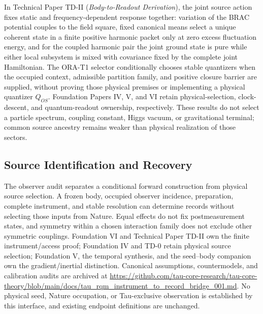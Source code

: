 \documentclass[11pt]{article}
\begin{document}
In Technical Paper TD-II (\emph{Body-to-Readout Derivation}), the joint source
action fixes static and frequency-dependent response together: variation of the
BRAC potential couples to the field square, fixed canonical means select a
unique coherent state in a finite positive harmonic packet only at zero excess
fluctuation energy, and for the coupled harmonic pair the joint ground state is
pure while either local subsystem is mixed with covariance fixed by the
complete joint Hamiltonian. The ORA-T1 selector conditionally chooses stable
quantizers when the occupied context, admissible partition family, and positive
closure barrier are supplied, without proving those physical premises or
implementing a physical quantizer $Q_{OS}$. Foundation Papers IV, V, and VI
retain physical-selection, clock-descent, and quantum-readout ownership,
respectively. These results do not select a particle spectrum, coupling
constant, Higgs vacuum, or gravitational terminal; common source ancestry
remains weaker than physical realization of those sectors.

\subsection{Source Identification and Recovery}
The observer audit separates a conditional forward construction from physical source selection. A frozen body, occupied observer incidence, preparation, complete instrument, and stable resolution can determine records without selecting those inputs from Nature. Equal effects do not fix postmeasurement states, and symmetry within a chosen interaction family does not exclude other symmetric couplings. Foundation VI and Technical Paper TD-II own the finite instrument/access proof; Foundation IV and TD-0 retain physical source selection; Foundation V, the temporal synthesis, and the seed--body companion own the gradient/inertial distinction. Canonical assumptions, countermodels, and calibration audits are archived at \url{https://github.com/tau-core-research/tau-core-theory/blob/main/docs/tau_rqm_instrument_to_record_bridge_001.md}. No physical seed, Nature occupation, or Tau-exclusive observation is established by this interface, and existing endpoint definitions are unchanged.

\end{document}
